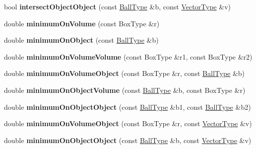 \begin{DoxyCompactItemize}
bool {\bfseries intersect\+Object\+Object} (const \hyperlink{struct_ball}{Ball\+Type} \&b, const \hyperlink{struct_vector_type}{Vector\+Type} \&v)
\item 
\mbox{\label{struct_ball_point_stuff_a3d46c4b90956c91b849e6ceb4d2c8423}} 
double {\bfseries minimum\+On\+Volume} (const Box\+Type \&r)
\item 
\mbox{\label{struct_ball_point_stuff_a2a21e6a7f4ca3c45ede152799c1531f2}} 
double {\bfseries minimum\+On\+Object} (const \hyperlink{struct_ball}{Ball\+Type} \&b)
\item 
\mbox{\label{struct_ball_point_stuff_ae7bcb3f2b204fd91867535dcd869a433}} 
double {\bfseries minimum\+On\+Volume\+Volume} (const Box\+Type \&r1, const Box\+Type \&r2)
\item 
\mbox{\label{struct_ball_point_stuff_a3bcf3e32fe9b91adac660f17d14e15b1}} 
double {\bfseries minimum\+On\+Volume\+Object} (const Box\+Type \&r, const \hyperlink{struct_ball}{Ball\+Type} \&b)
\item 
\mbox{\label{struct_ball_point_stuff_ac5ff4bc8b68c12ea9342c2a525839bc8}} 
double {\bfseries minimum\+On\+Object\+Volume} (const \hyperlink{struct_ball}{Ball\+Type} \&b, const Box\+Type \&r)
\item 
\mbox{\label{struct_ball_point_stuff_a4dfb3e06ed68a87e41fb5928b8af3ade}} 
double {\bfseries minimum\+On\+Object\+Object} (const \hyperlink{struct_ball}{Ball\+Type} \&b1, const \hyperlink{struct_ball}{Ball\+Type} \&b2)
\item 
\mbox{\label{struct_ball_point_stuff_ac6d7b05db89a8639fe0b9dfaac19e7ef}} 
double {\bfseries minimum\+On\+Volume\+Object} (const Box\+Type \&r, const \hyperlink{struct_vector_type}{Vector\+Type} \&v)
\item 
\mbox{\label{struct_ball_point_stuff_a6887f6414530bb2859c05f20c0d2c175}} 
double {\bfseries minimum\+On\+Object\+Object} (const \hyperlink{struct_ball}{Ball\+Type} \&b, const \hyperlink{struct_vector_type}{Vector\+Type} \&v)
\end{DoxyCompactItemize}
